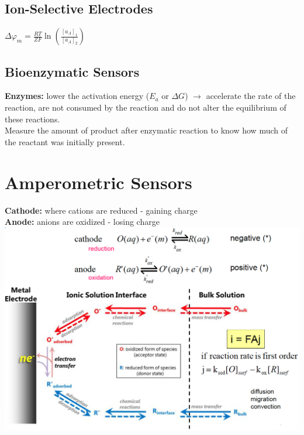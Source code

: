 \documentclass[9pt]{article}
\begin{document}
\begin{multicols}{2}
 \subsection{Ion-Selective Electrodes}
 $\Delta \varphi _m = \frac{RT}{ZF} \ln (\frac{[a_A]_1}{[a_A]_2})$
 \subsection{Bioenzymatic Sensors}
 \textbf{Enzymes: }lower the activation energy ($E_a$ or $\Delta G$) $\rightarrow$ accelerate the rate of the reaction, are not consumed by the reaction and do not alter the equilibrium of these reactions.\\
Measure the amount of product after enzymatic reaction to know how much of the reactant was initially present.
\section{Amperometric Sensors}
\textbf{Cathode: }where cations are reduced - gaining charge\\
\textbf{Anode: }anions are oxidized - losing charge\\
\includegraphics[scale=0.2]{Images/redox_current.png}

\end{multicols}
\end{document}
